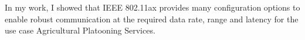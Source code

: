 In my work, I showed that IEEE 802.11ax provides many configuration options to enable robust communication at the required data rate, range and latency for the use case Agricultural Platooning Services.



\begin{comment}
    Untersuchen, welche Routing protocols
    Wi-Fi offers a wide range of physical layer configurations, which can be used to reduce the data rate and enable robust communication.

    Future work could investigate whether modern Wi-Fi can be used for other \ac{WIC} use cases.
    IEEE 802.11bd is a new standard, which is designed for \ac{WIC} in the industrial domain.
\end{comment}